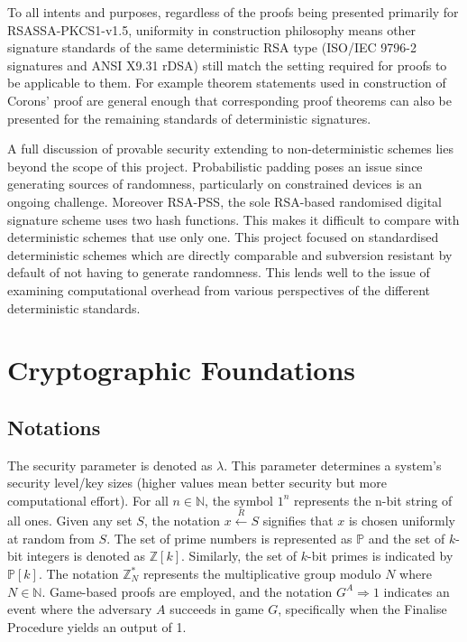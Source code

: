 \documentclass[]{final_report}
\theoremstyle{definition}
\begin{document}
To all intents and purposes, regardless of the proofs being presented primarily for RSASSA-PKCS1-v1.5, uniformity in construction philosophy means other signature standards of the same deterministic RSA type (ISO/IEC 9796-2 signatures and ANSI X9.31 rDSA) still match the setting required for proofs to be applicable to them. For example theorem statements used in construction of Corons' proof \cite{coron2002security} are general enough that corresponding proof theorems can also be presented for the remaining standards of deterministic signatures. 

A full discussion of provable security extending to non-deterministic schemes lies beyond the scope of this project. Probabilistic padding poses an issue since generating sources of randomness, particularly on constrained devices is an ongoing challenge. Moreover RSA-PSS, the sole RSA-based randomised digital signature scheme uses two hash functions. This makes it difficult to compare with deterministic schemes that use only one. This project focused on standardised deterministic schemes which are directly comparable and subversion resistant \cite{ateniese2015subversion} by default of not having to generate randomness. This lends well to the issue of examining computational overhead from various perspectives of the different deterministic standards.



\chapter{Cryptographic Foundations}
\section{Notations}
The security parameter is denoted as \( \lambda \). 
This parameter determines a system's security level/key sizes (higher values mean better security but more computational effort). For all \( n \in \mathbb{N} \), the symbol \( 1^n \) represents the n-bit string of all ones. Given any set \( S \), the notation \( x \stackrel{R}{\leftarrow} S \) signifies that \( x \) is chosen uniformly at random from \( S \).  The set of prime numbers is represented as \( \mathbb{P} \) and the set of \( k \)-bit integers is denoted as \( \mathbb{Z}[k] \). Similarly, the set of \( k \)-bit primes is indicated by \( \mathbb{P}[k] \). The notation \( \mathbb{Z}_N^* \) represents the multiplicative group modulo \( N \) where \( N \in \mathbb{N} \). Game-based proofs are employed, and the notation \( G^A \Rightarrow 1 \) indicates an event where the adversary \( A \) succeeds in game \( G \), specifically when the Finalise Procedure yields an output of 1.
\end{document}
